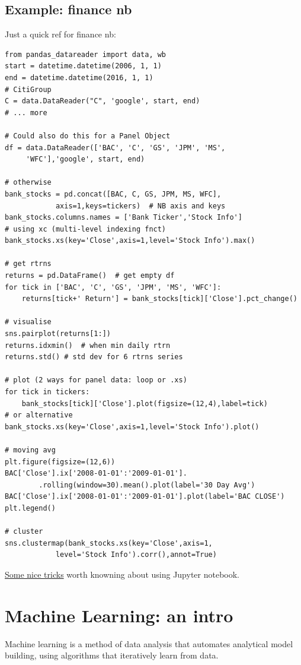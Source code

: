 \documentclass[11pt]{article}
\begin{document}
\subsection{Example: finance nb}
Just a quick ref for finance nb:
\begin{lstlisting}
from pandas_datareader import data, wb
start = datetime.datetime(2006, 1, 1)
end = datetime.datetime(2016, 1, 1)
# CitiGroup
C = data.DataReader("C", 'google', start, end)
# ... more

# Could also do this for a Panel Object
df = data.DataReader(['BAC', 'C', 'GS', 'JPM', 'MS',
	 'WFC'],'google', start, end)

# otherwise
bank_stocks = pd.concat([BAC, C, GS, JPM, MS, WFC],
			axis=1,keys=tickers)  # NB axis and keys
bank_stocks.columns.names = ['Bank Ticker','Stock Info']
# using xc (multi-level indexing fnct)
bank_stocks.xs(key='Close',axis=1,level='Stock Info').max()

# get rtrns
returns = pd.DataFrame()  # get empty df
for tick in ['BAC', 'C', 'GS', 'JPM', 'MS', 'WFC']:  
	returns[tick+' Return'] = bank_stocks[tick]['Close'].pct_change()

# visualise
sns.pairplot(returns[1:])
returns.idxmin()  # when min daily rtrn
returns.std() # std dev for 6 rtrns series

# plot (2 ways for panel data: loop or .xs)
for tick in tickers:
	bank_stocks[tick]['Close'].plot(figsize=(12,4),label=tick)
# or alternative
bank_stocks.xs(key='Close',axis=1,level='Stock Info').plot()

# moving avg
plt.figure(figsize=(12,6))
BAC['Close'].ix['2008-01-01':'2009-01-01'].
		.rolling(window=30).mean().plot(label='30 Day Avg')
BAC['Close'].ix['2008-01-01':'2009-01-01'].plot(label='BAC CLOSE')
plt.legend()

# cluster
sns.clustermap(bank_stocks.xs(key='Close',axis=1,
			level='Stock Info').corr(),annot=True)
\end{lstlisting}

\href{https://towardsdatascience.com/10-simple-hacks-to-speed-up-your-data-analysis-in-python-ec18c6396e6b}{Some nice tricks} worth knowning about using Jupyter notebook.

\section{Machine Learning: an intro} \label{sec:Machine}
Machine learning is a method of data analysis that automates analytical model building, using algorithms that iteratively learn from data.
\end{document}
